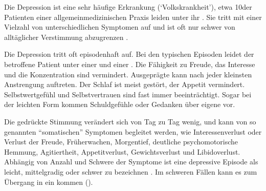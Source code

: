 {%
\label{topic:manie}%
\label{topic:depression}%

Die Depression ist eine sehr häufige Erkrankung
(\enquote*{Volkskrankheit}), etwa 10\PC* der Patienten einer
allgemeinmedizinischen Praxis leiden unter ihr
\cite{WunnPsych1}. Sie tritt mit einer Vielzahl von
unterschiedlichen Symptomen auf und ist oft nur schwer von
alltäglicher Verstimmung abzugrenzen
\cite{ScholzNotfallmedizin2-20.1-PsychiatrischeNot}.

Die Depression tritt oft episodenhaft auf. Bei den typischen
Episoden leidet der betroffene Patient unter einer
 und einer . Die Fähigkeit zu Freude, das
Interesse und die Konzentration sind vermindert. Ausgeprägte
 kann nach jeder kleinsten Anstrengung
auftreten. Der Schlaf ist meist gestört, der Appetit
vermindert. Selbstwertgefühl und Selbstvertrauen sind fast
immer beeinträchtigt. Sogar bei der leichten Form kommen
Schuldgefühle oder Gedanken über eigene 
vor.

Die gedrückte Stimmung verändert sich von Tag zu Tag wenig,
 und kann von so
genannten \enquote{somatischen} Symptomen begleitet werden, wie
Interessenverlust oder Verlust der Freude, Früherwachen,
Morgentief, deutliche psychomotorische Hemmung,
Agitiertheit, Appetitverlust, Gewichtsverlust und
Libidoverlust. Abhängig von Anzahl und Schwere der Symptome
ist eine depressive Episode als leicht, mittelgradig oder
schwer zu bezeichnen \cite{ICD10De}. 
Im schweren Fällen kann es zum Übergang in ein  kommen ().

}
